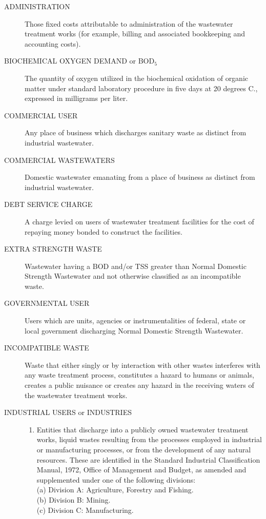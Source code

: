\begin{description}
\item[ADMINISTRATION] Those fixed costs attributable to administration of the wastewater treatment works (for example, billing and associated bookkeeping and accounting costs).
\item[BIOCHEMICAL OXYGEN DEMAND or BOD$_{5}$] The quantity of oxygen utilized in the biochemical oxidation of organic matter under standard laboratory procedure in five days at 20 degrees C., expressed in milligrams per liter.
\item[COMMERCIAL USER] Any place of business which discharges sanitary waste as distinct from industrial wastewater.
\item[COMMERCIAL WASTEWATERS] Domestic wastewater emanating from a place of business as distinct from industrial wastewater.
\item[DEBT SERVICE CHARGE] A charge levied on users of wastewater treatment facilities for the cost of repaying money bonded to construct the facilities.
\item[EXTRA STRENGTH WASTE] Wastewater having a BOD and/or TSS greater than Normal Domestic Strength Wastewater and not otherwise classified as an incompatible waste.
\item[GOVERNMENTAL USER] Users which are units, agencies or instrumentalities of federal, state or local government discharging Normal Domestic Strength Wastewater.
\item[INCOMPATIBLE WASTE] Waste that either singly or by interaction with other wastes interferes with any waste treatment process, constitutes a hazard to humans or animals, creates a public nuisance or creates any hazard in the receiving waters of the wastewater treatment works.
\item[INDUSTRIAL USERS or INDUSTRIES]
\begin{enumerate}
\item Entities that discharge into a publicly owned wastewater treatment works, liquid wastes resulting from the processes employed in industrial or manufacturing processes, or from the development of any natural resources.  These are identified in the Standard Industrial Classification Manual, 1972, Office of Management and Budget, as amended and supplemented under one of the following divisions:
\\\indent(a) Division A:  Agriculture, Forestry and Fishing.
\\\indent(b) Division B:  Mining.
\\\indent(c) Division C:  Manufacturing.

\end{enumerate}
\end{description}
